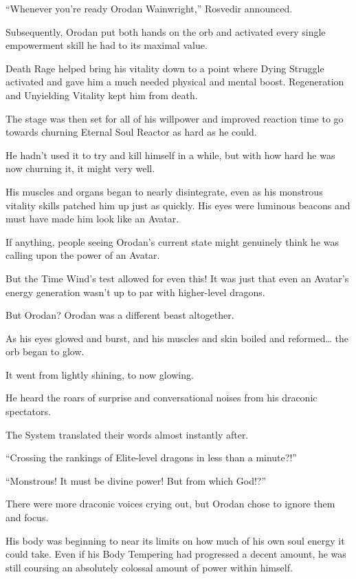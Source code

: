 \documentclass[a4paper,10pt]{book}
\begin{document}
“Whenever you’re ready Orodan Wainwright,” Rosvedir announced.\par
Subsequently, Orodan put both hands on the orb and activated every single empowerment skill he had to its maximal value.\par
Death Rage helped bring his vitality down to a point where Dying Struggle activated and gave him a much needed physical and mental boost. Regeneration and Unyielding Vitality kept him from death.\par
The stage was then set for all of his willpower and improved reaction time to go towards churning Eternal Soul Reactor as hard as he could.\par
He hadn’t used it to try and kill himself in a while, but with how hard he was now churning it, it might very well.\par
His muscles and organs began to nearly disintegrate, even as his monstrous vitality skills patched him up just as quickly. His eyes were luminous beacons and must have made him look like an Avatar.\par
If anything, people seeing Orodan’s current state might genuinely think he was calling upon the power of an Avatar.\par
But the Time Wind’s test allowed for even this! It was just that even an Avatar’s energy generation wasn’t up to par with higher-level dragons.\par
But Orodan? Orodan was a different beast altogether.\par
As his eyes glowed and burst, and his muscles and skin boiled and reformed… the orb began to glow.\par
It went from lightly shining, to now glowing.\par
He heard the roars of surprise and conversational noises from his draconic spectators.\par
The System translated their words almost instantly after.\par
“Crossing the rankings of Elite-level dragons in less than a minute?!”\par
“Monstrous! It must be divine power! But from which God!?”\par
There were more draconic voices crying out, but Orodan chose to ignore them and focus.\par
His body was beginning to near its limits on how much of his own soul energy it could take. Even if his Body Tempering had progressed a decent amount, he was still coursing an absolutely colossal amount of power within himself.\par
\end{document}
